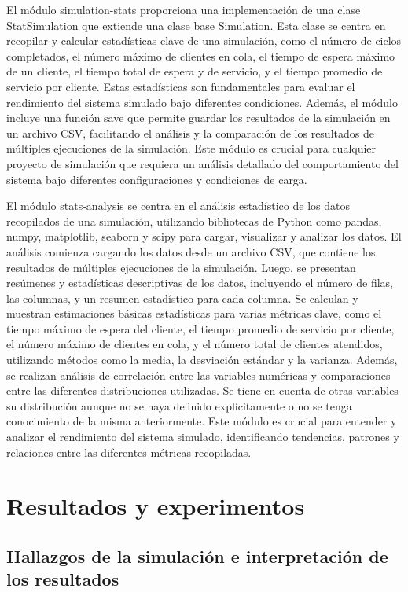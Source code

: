 \documentclass[12pt]{article}
\begin{document}
El módulo simulation-stats proporciona una implementación de una clase StatSimulation que extiende una clase base Simulation. Esta clase se centra en recopilar y calcular estadísticas clave de una simulación, como el número de ciclos completados, el número máximo de clientes en cola, el tiempo de espera máximo de un cliente, el tiempo total de espera y de servicio, y el tiempo promedio de servicio por cliente. Estas estadísticas son fundamentales para evaluar el rendimiento del sistema simulado bajo diferentes condiciones. Además, el módulo incluye una función save que permite guardar los resultados de la simulación en un archivo CSV, facilitando el análisis y la comparación de los resultados de múltiples ejecuciones de la simulación. Este módulo es crucial para cualquier proyecto de simulación que requiera un análisis detallado del comportamiento del sistema bajo diferentes configuraciones y condiciones de carga.

El módulo stats-analysis se centra en el análisis estadístico de los datos recopilados de una simulación, utilizando bibliotecas de Python como pandas, numpy, matplotlib, seaborn y scipy para cargar, visualizar y analizar los datos. El análisis comienza cargando los datos desde un archivo CSV, que contiene los resultados de múltiples ejecuciones de la simulación. Luego, se presentan resúmenes y estadísticas descriptivas de los datos, incluyendo el número de filas, las columnas, y un resumen estadístico para cada columna. Se calculan y muestran estimaciones básicas estadísticas para varias métricas clave, como el tiempo máximo de espera del cliente, el tiempo promedio de servicio por cliente, el número máximo de clientes en cola, y el número total de clientes atendidos, utilizando métodos como la media, la desviación estándar y la varianza. Además, se realizan análisis de correlación entre las variables numéricas y comparaciones entre las diferentes distribuciones utilizadas. Se tiene en cuenta de otras variables su distribución aunque no se haya definido explícitamente o no se tenga conocimiento de la misma anteriormente. Este módulo es crucial para entender y analizar el rendimiento del sistema simulado, identificando tendencias, patrones y relaciones entre las diferentes métricas recopiladas.


\section{Resultados y experimentos}
\subsection{Hallazgos de la simulación e interpretación de los resultados}
 
\end{document}
